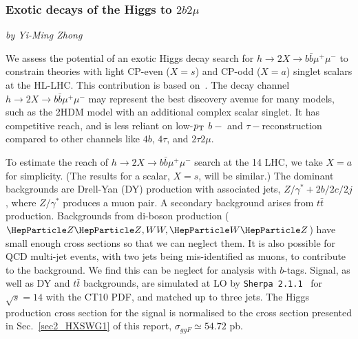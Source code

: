 \subsubsection{Exotic  decays of the Higgs to $2b2\mu$}
\begin{center}
 {\it{ by Yi-Ming Zhong}}
\end{center}
We assess the potential of an exotic Higgs decay search for $h \to 2X \to b\bar{b}\mu^+ \mu^-$ to constrain theories with light CP-even ($X = s$) and CP-odd ($X = a$) singlet scalars at the HL-LHC. This contribution is based on~\cite{Curtin:2014pda}. The decay channel $h \to 2X \to b\bar{b}\mu^+ \mu^-$ may represent the best discovery avenue for many models, such as the 2HDM model with an additional complex scalar singlet. It has competitive reach, and is less reliant on low-$p_{\rm T}$ $b-$ and $\tau-$reconstruction compared to other channels like $4b$, $4\tau$, and $2\tau2\mu$. 


To estimate the reach of $h \to 2X \to b\bar{b}\mu^+ \mu^-$ search at the 14 \UTeV LHC, we take $X =a$ for simplicity. (The results for a scalar, $X=s$, will be similar.) The dominant backgrounds are Drell-Yan (DY) production with associated jets, \ie $Z/\gamma^*+2b/2c/2j$, where $Z/\gamma^*$ produces a muon pair. A secondary background arises from $t\bar t$ production. Backgrounds from di-boson production ($\PZ\PZ, WW, \PW\PZ$) have small enough cross sections so that we can neglect them. It is also possible for QCD multi-jet events, with two jets being mis-identified as muons, to contribute to the background. We find this can be neglect for analysis with $b$-tags. Signal, as well as DY and $t\bar t$ backgrounds, are simulated at LO by \texttt{Sherpa 2.1.1}~\cite{Gleisberg:2008ta} for $\sqrt{s}=14$ \UTeV with the CT10 PDF, and matched up to three jets. The Higgs production cross section for the signal is normalised to the cross section presented in Sec.~\ref{sec2_HXSWG1} of this report, $\sigma_{ggF} \simeq 54.72$ pb.  



